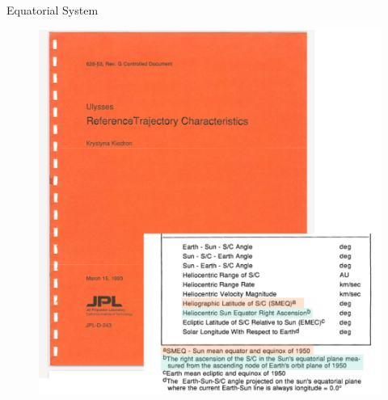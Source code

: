 \documentclass{beamer}
\begin{document}
\begin{frame}{Equatorial System}
\begin{figure}									
	\includegraphics[width=.7\textwidth]{Pics/KrystynaRef.png}
\end{figure}
\end{frame}
\end{document}
